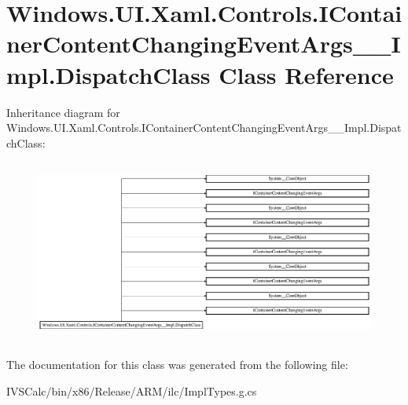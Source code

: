 \hypertarget{class_windows_1_1_u_i_1_1_xaml_1_1_controls_1_1_i_container_content_changing_event_args_____impl_1_1_dispatch_class}{}\section{Windows.\+U\+I.\+Xaml.\+Controls.\+I\+Container\+Content\+Changing\+Event\+Args\+\_\+\+\_\+\+Impl.\+Dispatch\+Class Class Reference}
\label{class_windows_1_1_u_i_1_1_xaml_1_1_controls_1_1_i_container_content_changing_event_args_____impl_1_1_dispatch_class}
Inheritance diagram for Windows.\+U\+I.\+Xaml.\+Controls.\+I\+Container\+Content\+Changing\+Event\+Args\+\_\+\+\_\+\+Impl.\+Dispatch\+Class\+:\begin{figure}[H]
\begin{center}
\leavevmode
\includegraphics[height=6.086957cm]{class_windows_1_1_u_i_1_1_xaml_1_1_controls_1_1_i_container_content_changing_event_args_____impl_1_1_dispatch_class}
\end{center}
\end{figure}


The documentation for this class was generated from the following file\+:\begin{DoxyCompactItemize}
\item 
I\+V\+S\+Calc/bin/x86/\+Release/\+A\+R\+M/ilc/Impl\+Types.\+g.\+cs\end{DoxyCompactItemize}
